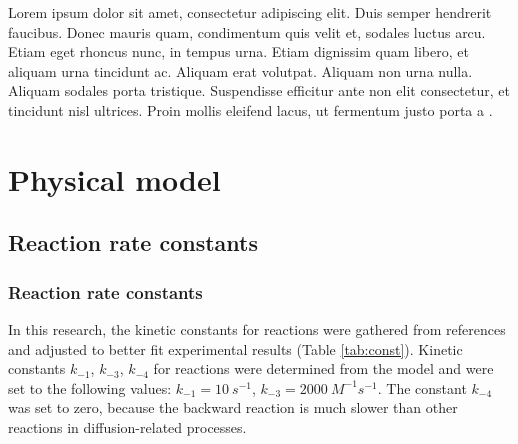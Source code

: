 Lorem ipsum dolor sit amet, consectetur adipiscing elit. Duis semper hendrerit faucibus. Donec mauris quam, condimentum quis velit et, sodales luctus arcu. Etiam eget rhoncus nunc, in tempus urna. Etiam dignissim quam libero, et aliquam urna tincidunt ac. Aliquam erat volutpat. Aliquam non urna nulla. Aliquam sodales porta tristique. Suspendisse efficitur ante non elit consectetur, et tincidunt nisl ultrices. Proin mollis eleifend lacus, ut fermentum justo porta a \cite{demoABook, demoArticle}.

\section{Physical model} \label{sec:reakc_phys}

\subsection{Reaction rate constants}  \label{subs:reakc_const}

\subsubsection{Reaction rate constants}  \label{subs:reakc_const2}

In this research, the kinetic constants for reactions were gathered from references  and adjusted to better fit experimental results (Table \ref{tab:const}). Kinetic constants $k_{-1}$, $k_{-3}$, $k_{-4}$ for reactions were determined from the model and were set to the following values: $k_{-1} = \SI{10}{s^{-1}}$, $k_{-3} = \SI{2000}{M^{-1}s^{-1}}$. The constant $k_{-4}$ was set to zero, because the backward reaction is much slower than other reactions in diffusion-related processes. 

